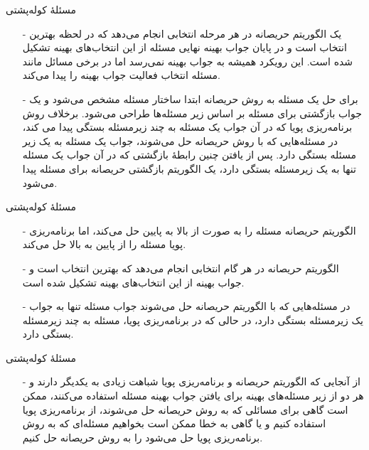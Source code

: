 \begin{frame}{مسئلهٔ کوله‌پشتی}
\begin{itemize}\itemr
\item[-]
یک الگوریتم حریصانه در هر مرحله انتخابی انجام می‌دهد که در لحظه بهترین انتخاب است و در پایان جواب بهینه نهایی مسئله از این انتخاب‌های بهینه تشکیل شده است. این رویکرد همیشه به جواب بهینه نمی‌رسد اما در برخی مسائل مانند مسئله انتخاب فعالیت جواب بهینه را پیدا می‌کند.
\item[-]
برای حل یک مسئله به روش حریصانه ابتدا ساختار مسئله مشخص می‌شود و یک جواب بازگشتی برای مسئله بر اساس زیر مسئله‌ها طراحی می‌شود. برخلاف روش برنامه‌ریزی پویا که در آن جواب یک مسئله به چند زیرمسئله بستگی پیدا می کند، در مسئله‌هایی که با روش حریصانه حل می‌شوند، جواب یک مسئله به یک زیر مسئله بستگی دارد. پس از یافتن چنین رابطهٔ بازگشتی که در آن جواب یک مسئله تنها به یک زیرمسئله بستگی دارد، یک الگوریتم بازگشتی حریصانه برای مسئله پیدا می‌شود.
\end{itemize}
\end{frame}

\begin{frame}{مسئلهٔ کوله‌پشتی}
\begin{itemize}\itemr
\item[-]
الگوریتم حریصانه مسئله را به صورت از بالا به پایین حل می‌کند، اما برنامه‌ریزی پویا مسئله را از پایین به بالا حل می‌کند.
\item[-]
الگوریتم حریصانه در هر گام انتخابی انجام می‌دهد که بهترین انتخاب است و جواب بهینه از این انتخاب‌های بهینه تشکیل شده است.
\item[-]
در مسئله‌هایی که با الگوریتم حریصانه حل می‌شوند جواب مسئله تنها به جواب یک زیرمسئله بستگی دارد، در حالی که در برنامه‌ریزی پویا، مسئله به چند زیرمسئله بستگی دارد.
\end{itemize}
\end{frame}

\begin{frame}{مسئلهٔ کوله‌پشتی}
\begin{itemize}\itemr
\item[-]
از آنجایی که الگوریتم حریصانه و برنامه‌ریزی پویا شباهت زیادی به یکدیگر دارند و هر دو از زیر مسئله‌های بهینه برای یافتن جواب بهینه مسئله استفاده می‌کنند، ممکن است گاهی برای مسائلی که به روش حریصانه حل می‌شوند، از برنامه‌ریزی پویا استفاده کنیم و یا گاهی به خطا ممکن است بخواهیم مسئله‌ای که به روش برنامه‌ریزی پویا حل می‌شود را به روش حریصانه حل کنیم.
\end{itemize}
\end{frame}


